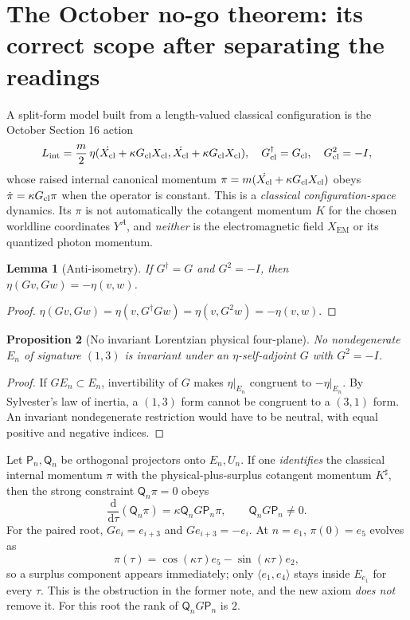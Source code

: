 \documentclass[10.5pt,a4paper]{article}
\newtheorem{proposition}{Proposition}[section]
\newtheorem{lemma}[proposition]{Lemma}
\newcommand{\dd}{\mathrm d}
\newcommand{\pr}{\mathsf P}
\newcommand{\qs}{\mathsf Q}
\newcommand{\Xcl}{X_{\mathrm{cl}}}
\newcommand{\Xem}{X_{\mathrm{EM}}}
\newcommand{\st}[1]{\textcolor{muted}{\small\sffamily [#1]}}
\begin{document}
\section{The October no-go theorem: its correct scope after separating the readings}
A split-form model built from a length-valued classical configuration is the October Section 16 action
\begin{equation}\label{eq:Lint}
 L_{\rm int}=\frac m2\,\eta(\dot{\Xcl}+\kappa G_{\rm cl}\Xcl,
 \dot{\Xcl}+\kappa G_{\rm cl}\Xcl),\quad
 G_{\rm cl}^\dagger=G_{\rm cl},\quad G_{\rm cl}^2=-I,
\end{equation}
whose raised internal canonical momentum $\pi=m(\dot{\Xcl}+\kappa G_{\rm cl}\Xcl)$ obeys $\dot\pi=\kappa G_{\rm cl}\pi$ when the operator is constant. This is a \emph{classical configuration-space} dynamics. Its $\pi$ is not automatically the cotangent momentum $K$ for the chosen worldline coordinates $Y^A$, and \emph{neither} is the electromagnetic field $\Xem$ or its quantized photon momentum.

\begin{lemma}[Anti-isometry]
\st{Proved} If $G^\dagger=G$ and $G^2=-I$, then $\eta(Gv,Gw)=-\eta(v,w)$.
\end{lemma}
\begin{proof}
$\eta(Gv,Gw)=\eta(v,G^\dagger Gw)=\eta(v,G^2w)=-\eta(v,w)$.
\end{proof}
\begin{proposition}[No invariant Lorentzian physical four-plane]\label{prop:nogo}
\st{Proved} No nondegenerate $E_n$ of signature $(1,3)$ is invariant under an $\eta$-self-adjoint $G$ with $G^2=-I$.
\end{proposition}
\begin{proof}
If $GE_n\subset E_n$, invertibility of $G$ makes $\eta|_{E_n}$ congruent to $-\eta|_{E_n}$. By Sylvester's law of inertia, a $(1,3)$ form cannot be congruent to a $(3,1)$ form. An invariant nondegenerate restriction would have to be neutral, with equal positive and negative indices.
\end{proof}
Let $\pr_n,\qs_n$ be orthogonal projectors onto $E_n,U_n$. If one \emph{identifies} the classical internal momentum $\pi$ with the physical-plus-surplus cotangent momentum $K^\sharp$, then the strong constraint $\qs_n\pi=0$ obeys
\begin{equation}\label{eq:failure}
 \frac{\dd}{\dd\tau}(\qs_n\pi)=\kappa\qs_nG\pr_n\pi,\qquad
 \boxed{\qs_n G\pr_n\ne0.}
\end{equation}
For the paired root, $Ge_i=e_{i+3}$ and $Ge_{i+3}=-e_i$. At $n=e_1$, $\pi(0)=e_5$ evolves as
\begin{equation}
 \pi(\tau)=\cos(\kappa\tau)e_5-\sin(\kappa\tau)e_2,
\end{equation}
so a surplus component appears immediately; only $\langle e_1,e_4\rangle$ stays inside $E_{e_1}$ for every $\tau$. This is the obstruction in the former note, and the new axiom \emph{does not} remove it. For this root the rank of $\qs_nG\pr_n$ is $2$.
\end{document}
